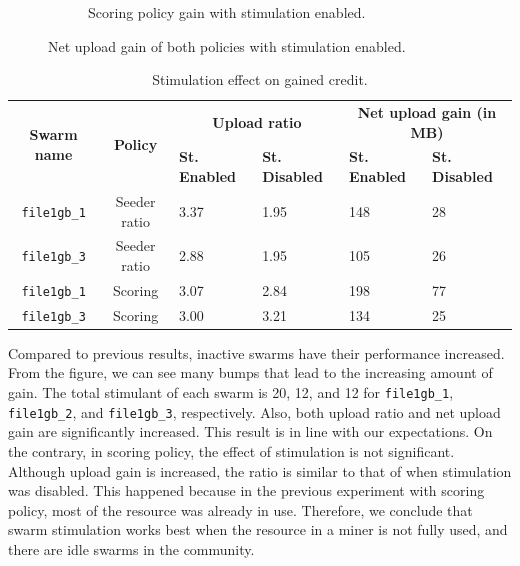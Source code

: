 \begin{figure}[h]
\begin{adjustwidth}{-1.5cm}{}
\begin{subfigure}[t]{0.6\textwidth}
			\caption{Scoring policy gain with stimulation enabled.}
			\label{fig:simplescsrtrig}
		\end{subfigure}
		\caption{Net upload gain of both policies with stimulation enabled.}
	\end{adjustwidth}
\end{figure}

\begin{table}[h]
	\centering
	\caption{Stimulation effect on gained credit.}
	\label{tbl:stimul}
	\begin{adjustwidth}{-1cm}{}
	\begin{tabular}{|c|c|l|l|l|l|}
		\hline
		\multirow{2}{*}{\textbf{Swarm name}} & \multirow{2}{*}{\textbf{Policy}} & \multicolumn{2}{c|}{\textbf{Upload ratio}} & \multicolumn{2}{c|}{\textbf{Net upload gain (in MB)}} \\ \cline{3-6} 
		&  & \textbf{St. Enabled} & \textbf{St. Disabled} & \textbf{St. Enabled} & \textbf{St. Disabled} \\ \hline
		\texttt{file1gb\_1} & Seeder ratio & 3.37 & 1.95 & 148 & 28 \\ \hline
		\texttt{file1gb\_3} & Seeder ratio & 2.88 & 1.95 & 105 & 26 \\ \hline
		\texttt{file1gb\_1} & Scoring & 3.07 & 2.84 & 198 & 77 \\ \hline
		\texttt{file1gb\_3} & Scoring & 3.00 & 3.21 & 134 & 25 \\ \hline
	\end{tabular}
\end{adjustwidth}
\end{table}

Compared to previous results, inactive swarms have  their performance increased. From the figure, we can see many bumps that lead to the increasing amount of gain. The total stimulant of each swarm is 20, 12, and 12 for \texttt{file1gb\_1}, \texttt{file1gb\_2}, and \texttt{file1gb\_3}, respectively. Also, both upload ratio and net upload gain are significantly increased. This result is in line with our expectations. On the contrary, in scoring policy, the effect of stimulation is not significant. Although upload gain is increased, the ratio is similar to that of when stimulation was disabled. This happened because in the previous experiment with scoring policy, most of the resource was already in use. Therefore, we conclude that swarm stimulation works best when the resource in a miner is not fully used, and there are idle swarms in the community.

